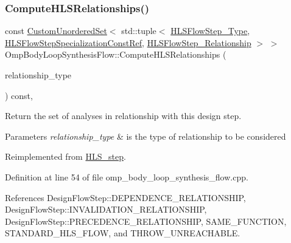 \subsubsection{\texorpdfstring{Compute\+H\+L\+S\+Relationships()}{ComputeHLSRelationships()}}
{\footnotesize\ttfamily const \hyperlink{classCustomUnorderedSet}{Custom\+Unordered\+Set}$<$ std\+::tuple$<$ \hyperlink{hls__step_8hpp_ada16bc22905016180e26fc7e39537f8d}{H\+L\+S\+Flow\+Step\+\_\+\+Type}, \hyperlink{hls__step_8hpp_a5fdd2edf290c196531d21d68e13f0e74}{H\+L\+S\+Flow\+Step\+Specialization\+Const\+Ref}, \hyperlink{hls__step_8hpp_a3ad360b9b11e6bf0683d5562a0ceb169}{H\+L\+S\+Flow\+Step\+\_\+\+Relationship} $>$ $>$ Omp\+Body\+Loop\+Synthesis\+Flow\+::\+Compute\+H\+L\+S\+Relationships (\begin{DoxyParamCaption}\item[{const \hyperlink{classDesignFlowStep_a723a3baf19ff2ceb77bc13e099d0b1b7}{Design\+Flow\+Step\+::\+Relationship\+Type}}]{relationship\+\_\+type }\end{DoxyParamCaption}) const\hspace{0.3cm}{\ttfamily [protected]}, {\ttfamily [virtual]}}



Return the set of analyses in relationship with this design step. 


\begin{DoxyParams}{Parameters}
{\em relationship\+\_\+type} & is the type of relationship to be considered \\
\hline
\end{DoxyParams}


Reimplemented from \hyperlink{classHLS__step_aed0ce8cca9a1ef18e705fc1032ad4de5}{H\+L\+S\+\_\+step}.



Definition at line 54 of file omp\+\_\+body\+\_\+loop\+\_\+synthesis\+\_\+flow.\+cpp.



References Design\+Flow\+Step\+::\+D\+E\+P\+E\+N\+D\+E\+N\+C\+E\+\_\+\+R\+E\+L\+A\+T\+I\+O\+N\+S\+H\+IP, Design\+Flow\+Step\+::\+I\+N\+V\+A\+L\+I\+D\+A\+T\+I\+O\+N\+\_\+\+R\+E\+L\+A\+T\+I\+O\+N\+S\+H\+IP, Design\+Flow\+Step\+::\+P\+R\+E\+C\+E\+D\+E\+N\+C\+E\+\_\+\+R\+E\+L\+A\+T\+I\+O\+N\+S\+H\+IP, S\+A\+M\+E\+\_\+\+F\+U\+N\+C\+T\+I\+ON, S\+T\+A\+N\+D\+A\+R\+D\+\_\+\+H\+L\+S\+\_\+\+F\+L\+OW, and T\+H\+R\+O\+W\+\_\+\+U\+N\+R\+E\+A\+C\+H\+A\+B\+LE.

\mbox{\label{classOmpBodyLoopSynthesisFlow_a9279d43752bc4d96ecf9d9a93b98ab1a}} 
